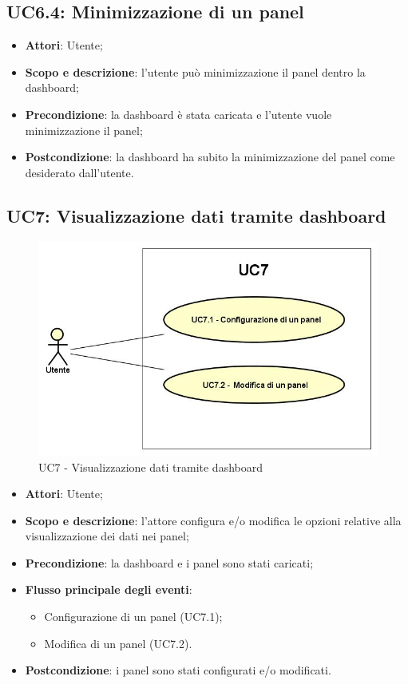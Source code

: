 \subsection{UC6.4: Minimizzazione di un panel}
\hypertarget{UC6.4}{}
\begin{itemize}
	\item \textbf{Attori}: Utente;
	\item \textbf{Scopo e descrizione}: l'utente può minimizzazione il panel dentro la dashboard;
	\item \textbf{Precondizione}: la dashboard è stata caricata e l'utente vuole minimizzazione il panel;
	\item \textbf{Postcondizione}: la dashboard ha subito la minimizzazione del panel come desiderato dall'utente.
\end{itemize}
\subsection{UC7: Visualizzazione dati tramite dashboard}
\hypertarget{UC7}{}
\begin{figure} [H]
	\centering
	\includegraphics[scale=0.45]{Img/UC7}
	\caption{UC7 - Visualizzazione dati tramite dashboard}\label{}
\end{figure}
\begin{itemize}
	\item \textbf{Attori}: Utente;
	\item \textbf{Scopo e descrizione}: l'attore configura e/o modifica le opzioni relative alla visualizzazione dei dati nei panel;
	\item \textbf{Precondizione}: la dashboard e i panel sono stati caricati;
	\item \textbf{Flusso principale degli eventi}:
	\begin{itemize}
		\item Configurazione di un panel (UC7.1);
		\item Modifica di un panel (UC7.2).
	\end{itemize}
	\item \textbf{Postcondizione}: i panel sono stati configurati e/o modificati.
\end{itemize}

